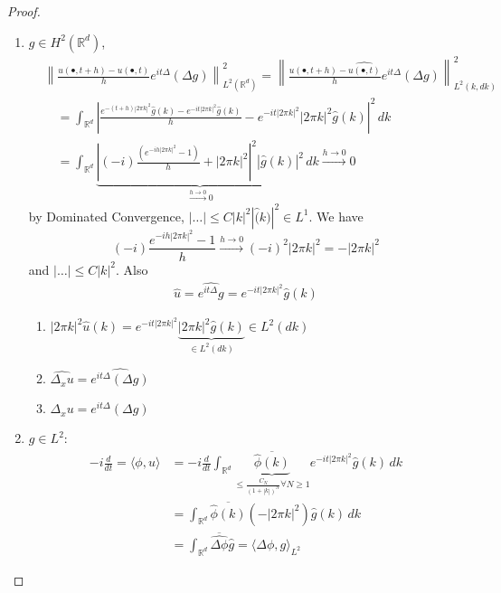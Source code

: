 \documentclass{report}
\theoremstyle{tommy}
\begin{document}
  \begin{proof}
    \begin{enumerate}
      \item \(g \in H^2(\mathbb{R}^d)\), 
      \begin{align*}
        &\left\| \frac{u(\bullet, t+h) - u(\bullet, t)}{h} e^{it \Delta} (\Delta g) \right\|_{L^2(\mathbb{R}^d)}^2 = \left\| \widehat{\frac{u(\bullet, t+h) - u(\bullet, t)}{h} e^{it \Delta} (\Delta g)}\right\|_{L^2(k, dk)}^2 \\
        &\quad= \int_{\mathbb{R}^d} \left| \frac{e^{- (t +h) | 2 \pi k|^2} \hat g(k) - e^{-it |2 \pi k|^2}\hat g(k)}{h} - e^{-it |2 \pi k|^2} | 2 \pi k|^2 \hat g (k) \right|^2 \, dk \\
        &\quad= \int_{\mathbb{R}^d} \underbrace{\left|(-i) \frac{(e^{-ih| 2 \pi k|^2}-1)}{h} + |2 \pi k|^2 \right|^2 |\hat g(k)|^2}_{\xrightarrow{h \to 0} 0} \, dk \xrightarrow{h \to 0} 0
      \end{align*}
      by Dominated Convergence,
      \(|\dots| \le C|k|^2|\hat (k)|^2 \in L^1\).
      We have 
      \[(-i) \frac{e^{-ih |2 \pi k|^2}-1}{h} \xrightarrow{h \to 0} (-i)^2 | 2 \pi k|^2 = - |2 \pi k|^2\]
      and \(|\dots| \le C|k|^2\). Also 
      \begin{align*}
        \hat u = \widehat{e^{it \Delta}g} = e^{-it | 2 \pi k|^2}\hat g(k)
      \end{align*}
        \begin{enumerate}[label=\(\Rightarrow\)]
          \item \(|2 \pi k|^2 \hat u(k) = e^{-it |2 \pi k|^2} \underbrace{|2 \pi k|^2 \hat g(k)}_{\in L^2(dk)} \in L^2(dk)\)
          \item \(\widehat{\Delta_x u}= \widehat{e^{it \Delta} (\Delta g)}\)
          \item \(\Delta_x u = e^{it \Delta}(\Delta g)\)
        \end{enumerate}
      \item \(g \in L^2\): 
      \begin{align*}
        - i \frac{d}{dt} = \langle \phi, u \rangle &= - i \frac{d}{dt} \int_{\mathbb{R}^d} \underbrace{\overline{\hat \phi(k)}}_{\le \frac{C_N}{(1 + |k|)^N} \forall N \ge 1} e^{-it  |2 \pi k|^2} \hat g(k) \, dk \\
        &= \int_{\mathbb{R}^d} \overline{\hat \phi(k)} (- |2 \pi k|^2) \hat g (k) \, dk \\
        &= \int_{\mathbb{R}^d} \overline{\widehat{\Delta \phi}} \hat g = \langle \Delta \phi, g\rangle_{L^2}
      \end{align*}

\end{enumerate}
\end{proof}
\end{document}
